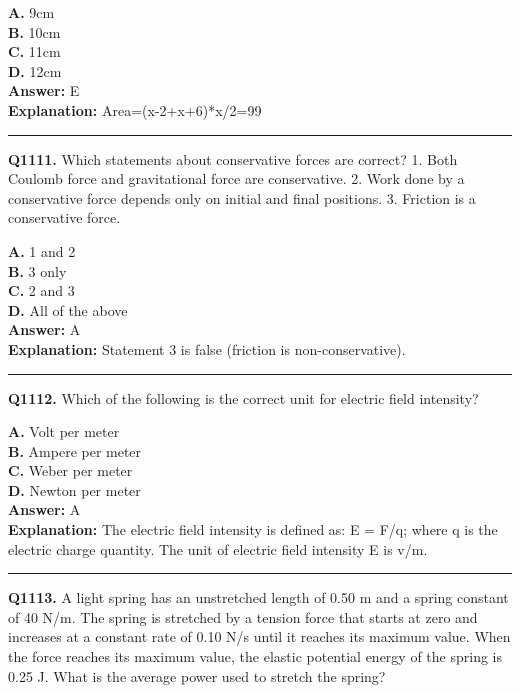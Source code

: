 \documentclass[12pt]{article}
\begin{document}
\textbf{A.} 9cm \\
\textbf{B.} 10cm \\
\textbf{C.} 11cm \\
\textbf{D.} 12cm \\

\textbf{Answer:} E \\
\textbf{Explanation:} Area=(x-2+x+6)*x/2=99

\hrule
\vspace{1em}


\noindent
\textbf{Q1111.} Which statements about conservative forces are correct?
1.
Both Coulomb force and gravitational force are conservative.
2.
Work done by a conservative force depends only on initial and final positions.
3. Friction is a conservative force.



\textbf{A.} 1 and 2 \\
\textbf{B.} 3 only \\
\textbf{C.} 2 and 3 \\
\textbf{D.} All of the above \\

\textbf{Answer:} A \\
\textbf{Explanation:} Statement 3 is false (friction is non-conservative).

\hrule
\vspace{1em}


\noindent
\textbf{Q1112.} Which of the following is the correct unit for electric field intensity?



\textbf{A.} Volt per meter \\
\textbf{B.} Ampere per meter \\
\textbf{C.} Weber per meter \\
\textbf{D.} Newton per meter \\

\textbf{Answer:} A \\
\textbf{Explanation:} The electric field intensity is defined as: E = F/q; where q is the electric charge quantity. The unit of electric field intensity E is v/m.

\hrule
\vspace{1em}


\noindent
\textbf{Q1113.} A light spring has an unstretched length of 0.50 m and a spring constant of 40 N/m. The spring is stretched by a tension force that starts at zero and increases at a constant rate of 0.10 N/s until it reaches its maximum value. When the force reaches its maximum value, the elastic potential energy of the spring is 0.25 J. What is the average power used to stretch the spring?
\end{document}
